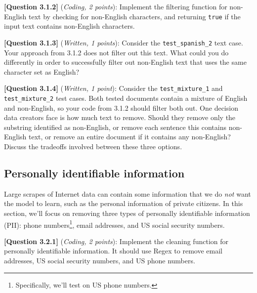 \documentclass[leqno,12pt]{article}
\begin{document}
\noindent \textbf{[Question 3.1.2]} (\emph{Coding, 2 points}):  Implement the filtering function for non-English text by checking for non-English characters, and returning \texttt{true} if the input text contains non-English characters.

\noindent \textbf{[Question 3.1.3]} (\emph{Written, 1 points}):  
Consider the \texttt{test\_spanish\_2} text case. Your approach from 3.1.2 does not filter out this text. What could you do differently in order to successfully filter out non-English text that uses the same character set as English?

\begin{tcolorbox}[fit,height=5cm, width=\linewidth, blank, borderline={1pt}{-2pt}]
\end{tcolorbox}

\noindent \textbf{[Question 3.1.4]} (\emph{Written, 1 point}): 
Consider the \texttt{test\_mixture\_1} and \texttt{test\_mixture\_2} test cases.
Both tested documents contain a mixture of English and non-English, so your code from 3.1.2 should filter both out.
One decision data creators face is how much text to remove.
Should they remove only the substring identified as non-English, or remove each sentence this contains non-English text, or remove an entire document if it contains any non-English? Discuss the tradeoffs involved between these three options.

\begin{tcolorbox}[fit,height=5cm, width=\linewidth, blank, borderline={1pt}{-2pt}]
\end{tcolorbox}



\subsection{Personally identifiable information}
\noindent Large scrapes of Internet data can contain some information that we do \textit{not} want the model to learn, such as the personal information of private citizens. In this section, we'll focus on removing three types of personally identifiable information (PII): phone numbers\footnote{Specifically, we'll test on US phone numbers.}, email addresses, and US social security numbers. 

\noindent \textbf{[Question 3.2.1]} (\emph{Coding, 2 points}): Implement the cleaning function for personally identifiable information.
It should use Regex to remove email addresses, US social security numbers, and US phone numbers.
\end{document}
